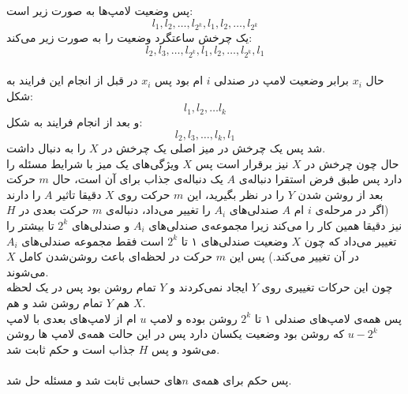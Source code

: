 \documentclass[12pt,a4paper]{article}
\begin{document}
پس وضعیت لامپ‌ها به صورت زیر است:
$$l_1, l_2, \dots, l_{2^k}, l_1, l_2, \dots, l_{2^k}$$
یک چرخش ساعتگرد وضعیت را به صورت زیر می‌کند:
$$l_2, l_3, \dots, l_{2^k}, l_1, l_2, \dots, l_{2^k}, l_1$$
\\
حال $x_i$ برابر وضعیت لامپ در صندلی $i$ ام بود پس $x_i$ در قبل از انجام این فرایند به شکل:
$$l_1, l_2, \dots l_k$$
و بعد از انجام فرایند به شکل:
$$l_2, l_3, \dots, l_k, l_1$$
شد پس یک چرخش در میز اصلی یک چرخش در $X$ را به دنبال داشت.
\\
حال چون چرخش در $X$ نیز برقرار است پس $X$ ویژگی‌های یک میز با شرایط مسئله را دارد پس طبق فرض استقرا دنباله‌ی $A$ یک دنباله‌ی جذاب برای آن است، حال $m$ حرکت بعد از روشن شدن $Y$ را در نظر بگیرید، این $m$ حرکت روی $X$ دقیقا تاثیر $A$ را دارند (اگر در مرحله‌ی $i$ ام $A$ صندلی‌های $A_i$ را تغییر می‌داد، دنباله‌ی $m$ حرکت بعدی در $H$ نیز دقیقا همین کار را می‌کند زیرا مجموعه‌ی صندلی‌های $A_i$ و صندلی‌های $2^k$ تا بیشتر را تغییر می‌داد که چون $X$ وضعیت صندلی‌های ۱ تا $2^k$ است فقط مجموعه صندلی‌های $A_i$ در آن تغییر می‌کند.) پس این $m$ حرکت در لحظه‌ای باعث روشن‌شدن کامل $X$ می‌شوند.
\\
چون این حرکات تغییری روی $Y$ ایجاد نمی‌کردند و $Y$ تمام روشن بود پس در یک لحظه هم $Y$ تمام روشن شد و هم $X$.
\\
 پس همه‌ی لامپ‌های صندلی ۱ تا $2^k$ روشن بوده و لامپ $u$ ام از لامپ‌های بعدی با لامپ $u-2^k$ که روشن بود وضعیت یکسان دارد پس در این حالت همه‌ی لامپ ها روشن می‌شود و پس $H$ جذاب است و حکم ثابت شد.
 \\
 \\

پس حکم برای همه‌ی $n$های حسابی ثابت شد و مسئله حل شد.
\end{document}
